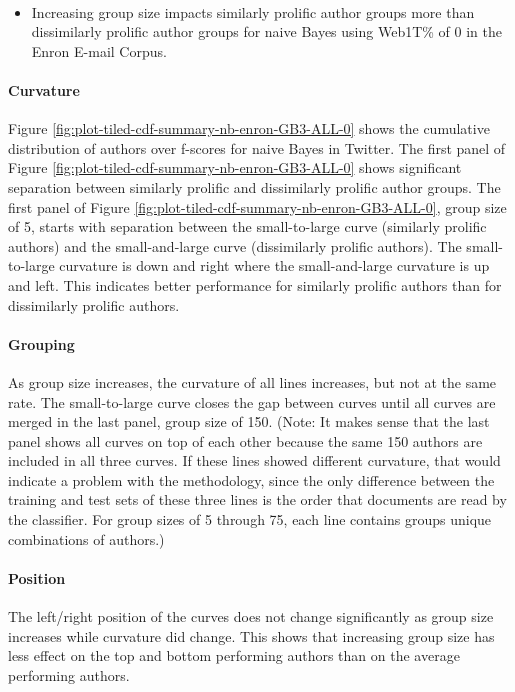\paragraph*{} 
\begin{itemize}
\item Increasing group size impacts similarly prolific author groups more than dissimilarly prolific author groups for naive Bayes using Web1T\% of 0 in the Enron E-mail Corpus.
\end{itemize}
\paragraph*{Curvature} Figure \ref{fig:plot-tiled-cdf-summary-nb-enron-GB3-ALL-0} shows the cumulative distribution of authors over f-scores for naive Bayes in Twitter.  The first panel of Figure \ref{fig:plot-tiled-cdf-summary-nb-enron-GB3-ALL-0} shows significant separation between similarly prolific and dissimilarly prolific author groups. The first panel of Figure \ref{fig:plot-tiled-cdf-summary-nb-enron-GB3-ALL-0}, group size of 5, starts with separation between the small-to-large curve (similarly prolific authors) and the small-and-large curve (dissimilarly prolific authors).  The small-to-large curvature is down and right where the small-and-large curvature is up and left.  This indicates better performance for similarly prolific authors than for dissimilarly prolific authors. 
\paragraph*{Grouping}As group size increases, the curvature of all lines increases, but not at the same rate.  The small-to-large curve closes the gap between curves until all curves are merged in the last panel, group size of 150.  (Note: It makes sense that the last panel shows all curves on top of each other because the same 150 authors are included in all three curves.  If these lines showed different curvature, that would indicate a problem with the methodology, since the only difference between the training and test sets of these three lines is the order that documents are read by the classifier.  For group sizes of 5 through 75, each line contains groups unique combinations of authors.)
\paragraph*{Position}The left/right position of the curves does not change significantly as group size increases while curvature did change.  This shows that increasing group size has less effect on the top and bottom performing authors than on the average performing authors.
